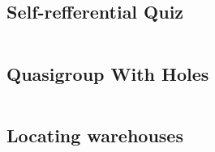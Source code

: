 \subsection{Self-refferential Quiz}
\label{implementation:gecode:srq}
\begin{lstlisting}[language=Java]

\end{lstlisting}

\subsection{Quasigroup With Holes}
\begin{lstlisting}[language=Java]

\end{lstlisting}

\subsection{Locating warehouses}
\begin{lstlisting}[language=Java]

\end{lstlisting}